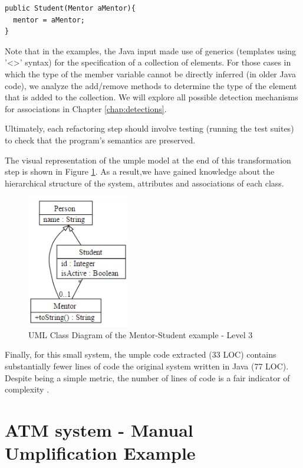 \begin{lstlisting}[style=java,caption=A new constructor added to Student class,label=lst:studentConstructor]
public Student(Mentor aMentor){
  mentor = aMentor;
}
\end{lstlisting}

Note that in the examples, the Java input made use of generics (templates using '<>' syntax) for the specification of a collection of elements. For those cases in which the type of the member variable cannot be directly inferred (in older Java code), we analyze the add/remove methods to determine the type of the element that is added to the collection. We will explore all possible detection mechanisms for associations in Chapter \ref{chap:detections}.

Ultimately, each refactoring step should involve testing (running the test suites) to check that the program's semantics are preserved. 

The visual representation of the umple model at the end of this transformation step is shown in Figure \ref{fig:Example1a3}. As a result,we have gained knowledge about the hierarchical structure of the system, attributes and associations of each class. 

\begin{figure}[h]
\centering
\includegraphics[width=0.40\textwidth]{Figures/Example1a3.png} 
\caption{UML Class Diagram of the Mentor-Student example - Level 3}
\label{fig:Example1a3}
\end{figure}

Finally, for this small system, the umple code extracted (33 LOC) contains substantially fewer lines of code the original system written in Java (77 LOC). Despite being a simple metric, the number of lines of code is a fair indicator of complexity \cite{LOCMetric}. 

\section{ATM system - Manual Umplification Example}

